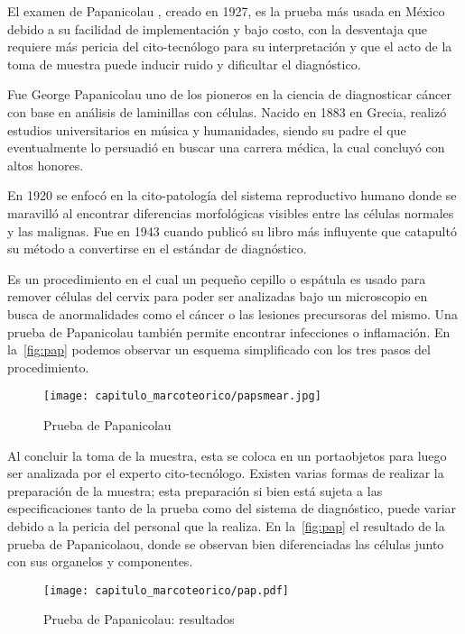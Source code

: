 El examen de Papanicolau , creado en 1927, es la
prueba más usada en México debido a su facilidad de implementación y bajo costo,
con la desventaja que requiere más pericia del cito-tecnólogo para su
interpretación y que el acto de la toma de muestra puede inducir ruido y
dificultar el diagnóstico. 

Fue George Papanicolau uno de los pioneros en la ciencia de diagnosticar cáncer
con base en análisis de laminillas con células. Nacido en 1883 en Grecia, realizó
estudios universitarios en música y humanidades, siendo su padre el que eventualmente
lo persuadió en buscar una carrera médica, la cual concluyó con altos honores.

En 1920 se enfocó en la cito-patología del sistema reproductivo humano donde se
maravilló al encontrar diferencias morfológicas visibles entre las células
normales y las malignas. Fue en 1943 cuando publicó su libro más influyente que
catapultó su método a convertirse en el estándar de diagnóstico.~\cite{Tan2015}

Es un procedimiento en el cual un pequeño cepillo o espátula es usado para
remover células del cervix para poder ser analizadas bajo un microscopio en
busca de anormalidades como el cáncer o las lesiones precursoras del mismo. Una
prueba de Papanicolau también permite encontrar infecciones o inflamación. En
la~\autoref{fig:pap} podemos observar un esquema simplificado con los tres pasos
del procedimiento.~\cite{NationalCancerInstitutea}
\begin{figure}[H]
    \centering
    \texttt{[image: capitulo\_marcoteorico/papsmear.jpg]}
    \caption{Prueba de Papanicolau}\label{fig:pap}
\end{figure}

Al concluir la toma de la muestra, esta se coloca en un portaobjetos para luego
ser analizada por el experto cito-tecnólogo. Existen varias formas de realizar
la preparación de la muestra; esta preparación si bien está sujeta a las
especificaciones tanto de la prueba como del sistema de diagnóstico, puede
variar debido a la pericia del personal que la realiza. En la~\autoref{fig:pap}
el resultado de la prueba de Papanicolaou, donde se observan bien diferenciadas
las células junto con sus organelos y componentes.

\begin{figure}[H]
    \centering
    \texttt{[image: capitulo\_marcoteorico/pap.pdf]}
    \caption{Prueba de Papanicolau: resultados}\label{fig:pap}
\end{figure}

